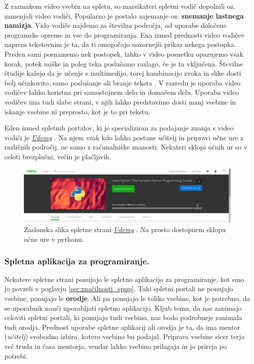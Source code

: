 Z razmakom video vsebin na spletu, so marsikateri spletni vodič
dopolnili oz. zamenjali video vodiči. Popularno je postalo zajemanje
oz. \textbf{snemanje lastnega namizja}. Vido vodiče najdemo za
številna področja, od uporabe določene programske opreme in vse do
programiranja. Ena izmed prednosti video vodičev naprem tekstovnim je
ta, da ti omogočajo nazornejši prikaz nekega postopka. Preden sami
posnamemo nek postopek, lahko v video posnetku opazujemo vsak korak,
potek miške in poleg teka poslušamo razlago, če je ta vključena.
Številne študije kažejo da je učenje s multimedijo, torej kombinacijo
zvoka in slike dosti bolj učinkovito, samo poslušanje ali branje
teksta \cite{web:multimediaL}. V razredu je uporaba video vodičev
lahko koristna pri samostojnem delu in domačem delu. Uporaba video
vodičev ima tudi slabe strani, v njih lahko predstavimo dosti manj
vsebine in iskanje vsebine ni preprosto, kot je to pri tekstu.

Eden izmed spletnih portalov, ki je specializiran za podajanje znanja
s video vodiči je \emph{\href{https://www.udemy.com}{Udemy}}
\cite{web:udemy}. Na njem vsak kdo lahko postane učitelj in pripravi
učne ure z različnih področij, ne samo z računalniške
znanosti. Nekateri sklopi učnih ur so v celoti brezplačni, večin je
plačljivih.

\begin{figure}[h!]
    \includegraphics [width=1\linewidth, keepaspectratio =
    1] {./images/sc_web/udemy_01.png}
    \caption{Zaslonska slika spletne strani
      \emph{\href{https://www.udemy.com}{Udemy}}
      \cite{web:udemy}. Na prosto dostopnem sklopu učne ure v
      pythonu.}
    \label{fig:scr:web:udemy}
\end{figure}

\subsubsection{Spletna aplikacija za programiranje.}
\label{sec:spletna_app_programiranje}

Nekatere spletne strani ponujajo le spletno aplikacijo za
programiranje, kot smo jo povzeli v poglavju
\ref{sec:značilnosti_spup}. Taki spletni portali ne ponujajo vsebine,
ponujajo le \textbf{orodje}. Ali pa ponujajo le toliko vsebine, kot je
potrebno, da se uporabnik nauči uporabljati spletno aplikacijo. Kljub
temu, da nas zanimajo celoviti spletni portali, ki ponujajo tudi
vsebino, nas bodo podrobneje zanimala tudi orodja. Prednost uporabe
spletne aplikacij ali orodja je ta, da ima mentor (\emph{učitelj})
svobodno izbiro, katero vsebino bo podajal. Priprava vsebine sicer
terja več truda in časa mentorja, vendar lahko vsebino prilagaja in jo
prireja po potrebi.

